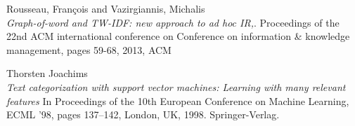 \begin{thebibliography}{9}
	Rousseau, Fran{\c{c}}ois and Vazirgiannis, Michalis~\\
	\textit{Graph-of-word and TW-IDF: new approach to ad hoc IR,}. 
	 Proceedings of the 22nd ACM international conference on Conference on information \& knowledge management, pages 59-68,
	2013, ACM
	
	Thorsten Joachims~\\
	\textit{Text categorization with support vector machines: Learning with many relevant features}
	In Proceedings of the 10th European Conference on Machine Learning, ECML ’98, pages 137–142, London, UK, 1998. Springer-Verlag.
	

\end{thebibliography}
